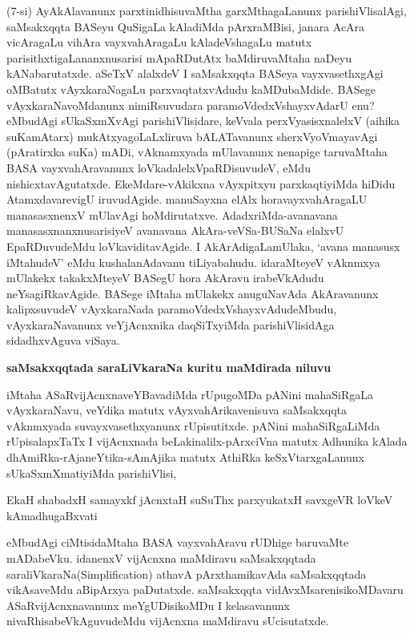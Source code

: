 \noindent
(7-si) AyAkAlavanunx parxtinidhisuvaMtha garxMthagaLanunx parishiVlisalAgi, saMsakxqqta BASeyu QuSigaLa kAladiMda pArxraMBisi, janara AcAra vicAragaLu vihAra vayxva\-hAragaLu kAladeVshagaLu matutx parisithxtigaLa\-nanxnusarisi mApaRDutAtx baMdiru\break\-vaMtaha naDeyu kANabarutatxde. aSeTxV alalxdeV I saMsakxqqta BASeya vayxvasethx\-gAgi oMBatutx vAyxkaraNagaLu parxvaqtatxvAdudu kaMDubaMdide. BASege vAyxkaraNa\-voMdanunx nimiRsu\-vudara paramoVdedxVshayxvAdarU enu? eMbudAgi 
sUkaSxmXvAgi pari\-shiVli\-sidare, keVvala perxVyasisxnalelxV (aihika suKamAtarx) mukAtxyagoLaLxliruva bALATa\-vanunx sherxVyoVmayavAgi (pAratirxka suKa) mADi, vAknamxyada mUlavanunx nena\-pige taruvaMtaha BASA vayxvahAravanunx loVkadalelxVpaRDisuvudeV, eMdu nishicxta\-vAgutatxde. EkeMdare-vAkikxna vAyxpitxyu parxkaqtiyiMda hiDidu AtamxdavarevigU iruvudAgide. manuSayxna elAlx horavayxvahAragaLU manasasxnenxV mUlavAgi hoMdi\-rutatxve. AdadxriMda-avanavana manasasxnanxnusarisiyeV avanavana AkAra-veVSa-\break\-BUSaNa elalxvU EpaRDuvudeMdu loVkaviditavAgide. I AkArAdigaLa\break mUlaka, `avana manasusx iMtahudeV' eMdu kushalanAdavanu tiLiyabahudu. ida\-raMteyeV vAknmxya mUlakekx takakxMteyeV BASegU hora AkAravu ira\-beVkA\-dudu neYsagiRkavAgide. BASege iMtaha mUlakekx anuguNavAda AkAravanunx kalipxsuvudeV vAyxkaraNada paramoVdedxVshayxvAdudeMbudu, vAyxkaraNavanunx veYjAcnxnika daqSiTxyiMda parishiVlisidAga sidadhxvAguva viSaya.

{\bigskip
\noindent
{\large\bf saMsakxqqtada saraLiVkaraNa kuritu maMdirada niluvu}}\label{page35}
\medskip

\noindent
iMtaha ASaRvijAcnxnaveYBavadiMda rUpugoMDa pANini mahaSiRgaLa vAyxkaraNavu, veYdika matutx vAyxva\-hArikavenisuva saMsakxqqta vAknmxyada suvayxvasethxyanunx rUpisu\-titxde. pANini mahaSiRgaLiMda rUpisa\-lapxTaTx I vijAcnxnada beLakinalilx-pArxciVna matutx Adhunika kAlada dhAmiRka-rAjaneYtika-sAmAjika matutx AthiRka keSxVtarxgaLanunx sUkaSxmXmatiyiMda parishiVlisi,

\begin{shloka}
EkaH shabadxH samayxkf jAcnxtaH suSuThx parxyukatxH savxgeVR loVkeV kAmadhugaBxvati\label{35}
\end{shloka}

eMbudAgi ciMtisidaMtaha BASA vayxvahAravu rUDhige baruvaMte mADa\-beVku. idanenxV vijAcnxna maMdiravu saMsakxqqtada saraliVkaraNa{(\rm Simplification)} athavA pArxthamikavAda saMsakxqqtada vikAsaveMdu aBipArxya paDutatxde. saMsakxqqta vidAvxMsarenisikoMDavaru ASaRvijAcnxnavanunx meYgUDisikoMDu I kelasa\-vanunx nivaRhisabeVkAguvudeMdu vijAcnxna maMdiravu sUcisutatxde.


